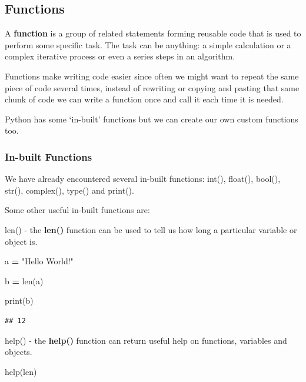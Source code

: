 \documentclass[
]{book}
\newenvironment{Shaded}{\begin{snugshade}}{\end{snugshade}}
\newcommand{\BuiltInTok}[1]{#1}
\newcommand{\NormalTok}[1]{#1}
\newcommand{\OperatorTok}[1]{\textcolor[rgb]{0.81,0.36,0.00}{\textbf{#1}}}
\newcommand{\StringTok}[1]{\textcolor[rgb]{0.31,0.60,0.02}{#1}}
\begin{document}
\hypertarget{functions}{%
\subsection{Functions}\label{functions}}

A \textbf{function} is a group of related statements forming reusable code that is used to perform some specific task. The task can be anything: a simple calculation or a complex iterative process or even a series steps in an algorithm.

Functions make writing code easier since often we might want to repeat the same piece of code several times, instead of rewriting or copying and pasting that same chunk of code we can write a function once and call it each time it is needed.

Python has some `in-built' functions but we can create our own custom functions too.

\hypertarget{in-built-functions}{%
\subsubsection{In-built Functions}\label{in-built-functions}}

We have already encountered several in-built functions: int(), float(), bool(), str(), complex(), type() and print().

Some other useful in-built functions are:

len() - the \textbf{len()} function can be used to tell us how long a particular variable or object is.

\begin{Shaded}
\begin{Highlighting}[]
\NormalTok{a }\OperatorTok{=} \StringTok{"Hello World!"}

\NormalTok{b }\OperatorTok{=} \BuiltInTok{len}\NormalTok{(a)}

\BuiltInTok{print}\NormalTok{(b)}
\end{Highlighting}
\end{Shaded}

\begin{verbatim}
## 12
\end{verbatim}

help() - the \textbf{help()} function can return useful help on functions, variables and objects.

\begin{Shaded}
\begin{Highlighting}[]

\BuiltInTok{help}\NormalTok{(}\BuiltInTok{len}\NormalTok{)}
\end{Highlighting}
\end{Shaded}
\end{document}
